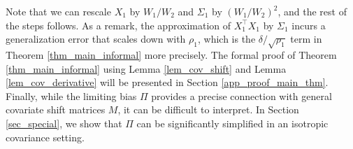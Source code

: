 Note that we can rescale $X_1$ by $W_1 / W_2$ and $\Sigma_1$ by $(W_1 / W_2)^2$, and the rest of the steps follows.
As a remark, the approximation of $X_1^{\top}X_1$ by $\Sigma_1$ incurs a generalization error that scales down with $\rho_1$, which is the $\delta / \sqrt{\rho_1}$ term in Theorem \ref{thm_main_informal} more precisely. The formal proof of Theorem \ref{thm_main_informal} using Lemma \ref{lem_cov_shift} and Lemma \ref{lem_cov_derivative} will be presented in Section \ref{app_proof_main_thm}.
Finally, while the limiting bias $\Pi$ provides a precise connection with general covariate shift matrices $M$, it can be difficult to interpret.
In Section \ref{sec_special}, we show that $\Pi$ can be significantly simplified in an isotropic covariance setting.

%
%
%


